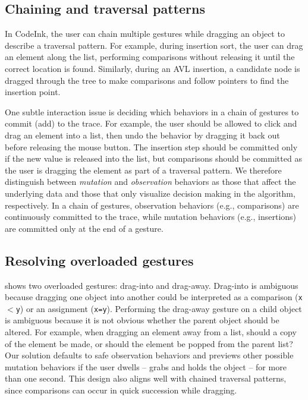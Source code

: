 \subsection{Chaining and traversal patterns}
In CodeInk, the user can chain multiple gestures while dragging an object to
describe a traversal pattern. For example, during insertion sort, the user can
drag an element along the list, performing comparisons without releasing it
until the correct location is found. Similarly, during an AVL insertion, a
candidate node is dragged through the tree to make comparisons and follow
pointers to find the insertion point.

One subtle interaction issue is deciding which behaviors in a chain of
gestures to commit (add) to the trace. For example, the user should be
allowed to click and drag an element into a list, then undo the behavior
by dragging it back out before releasing the mouse button. The insertion
step should be committed only if the new value is released into the
list, but comparisons should be committed as the user is dragging the
element as part of a traversal pattern. We therefore distinguish between
\emph{mutation} and \emph{observation} behaviors as those that affect
the underlying data and those that only visualize decision making in the
algorithm, respectively. In a chain of gestures, observation behaviors
(e.g., comparisons) are continuously committed to the trace, while
mutation behaviors (e.g., insertions) are committed only at the end of a
gesture.

\subsection{Resolving overloaded gestures}
\label{sec:overloaded-gestures}

 shows two overloaded gestures: drag-into and
drag-away. Drag-into is ambiguous because dragging one object into
another could be interpreted as a comparison (\texttt{x$<$y}) or an
assignment (\texttt{x=y}).
Performing the drag-away gesture on a child object is ambiguous because
it is not obvious whether the parent object should be altered. For
example, when dragging an element away from a list, should a copy of the
element be made, or should the element be popped from the parent list?
%
Our solution defaults to safe observation behaviors and previews other
possible mutation behaviors if the user dwells -- grabs and holds the
object -- for more than one second.
This design also aligns well with chained traversal patterns, since
comparisons can occur in quick succession while dragging.

